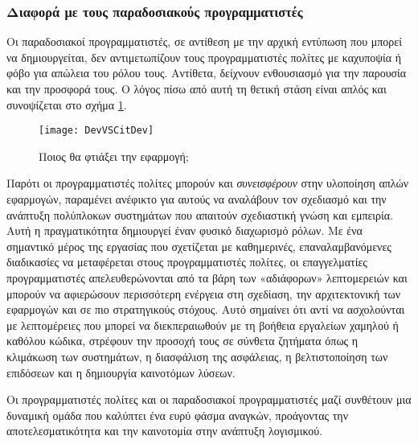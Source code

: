                 \subsubsection{Διαφορά με τους παραδοσιακούς προγραμματιστές}
                    Οι παραδοσιακοί προγραμματιστές, σε αντίθεση με την αρχική εντύπωση που μπορεί να δημιουργείται, δεν αντιμετωπίζουν τους προγραμματιστές πολίτες με καχυποψία ή φόβο για απώλεια του ρόλου τους. Αντίθετα, δείχνουν ενθουσιασμό για την παρουσία και την προσφορά τους. Ο λόγος πίσω από αυτή τη θετική στάση είναι απλός και συνοψίζεται στο σχήμα \ref{fig:DevVSCitDev}.

                    \begin{figure}[h!] \noindent \centering
                            \texttt{[image: DevVSCitDev]}
                            \caption{Ποιος θα φτιάξει την εφαρμογή; \cite{LowCodeSimon}}
                            \label{fig:DevVSCitDev}
                    \end{figure}

                    Παρότι οι προγραμματιστές πολίτες μπορούν και \textit{συνεισφέρουν} στην υλοποίηση απλών εφαρμογών, παραμένει ανέφικτο για αυτούς να αναλάβουν τον σχεδιασμό και την ανάπτυξη πολύπλοκων συστημάτων που απαιτούν σχεδιαστική γνώση και εμπειρία. Αυτή η πραγματικότητα δημιουργεί έναν φυσικό διαχωρισμό ρόλων. Με ένα σημαντικό μέρος της εργασίας που σχετίζεται με καθημερινές, επαναλαμβανόμενες διαδικασίες να μεταφέρεται στους προγραμματιστές πολίτες, οι επαγγελματίες προγραμματιστές απελευθερώνονται από τα βάρη των «αδιάφορων» λεπτομερειών και μπορούν να αφιερώσουν περισσότερη ενέργεια στη σχεδίαση, την αρχιτεκτονική των εφαρμογών και σε πιο στρατηγικούς στόχους. Αυτό σημαίνει ότι αντί να ασχολούνται με λεπτομέρειες που μπορεί να διεκπεραιωθούν με τη βοήθεια εργαλείων χαμηλού ή καθόλου κώδικα, στρέφουν την προσοχή τους σε σύνθετα ζητήματα όπως η κλιμάκωση των συστημάτων, η διασφάλιση της ασφάλειας, η βελτιστοποίηση των επιδόσεων και η δημιουργία καινοτόμων λύσεων.

                    Οι προγραμματιστές πολίτες και οι παραδοσιακοί προγραμματιστές μαζί συνθέτουν μια δυναμική ομάδα που καλύπτει ένα ευρύ φάσμα αναγκών, προάγοντας την αποτελεσματικότητα και την καινοτομία στην ανάπτυξη λογισμικού.

